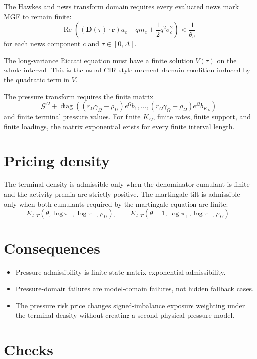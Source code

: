 \documentclass[11pt]{article}
\begin{document}
The Hawkes and news transform domain requires every evaluated news mark MGF to
remain finite:
\[
    \operatorname{Re}\!\left(
        (\mathbf D(\tau)\cdot\mathbf r)a_c
        +qm_c
        +\frac{1}{2}q^2\sigma_c^2
    \right)
    <
    \frac{1}{\theta_U}
\]
for each news component \(c\) and \(\tau\in[0,\Delta]\).

The long-variance Riccati equation must have a finite solution \(V(\tau)\) on
the whole interval.
This is the usual CIR-style moment-domain condition induced by the quadratic
term in \(V\).

The pressure transform requires the finite matrix
\[
    \mathcal G^\Omega+\operatorname{diag}\left(
        (r_\Omega\gamma_\Omega-\rho_\Omega)e^\Omega b_1,
        \ldots,
        (r_\Omega\gamma_\Omega-\rho_\Omega)e^\Omega b_{K_\Omega}
    \right)
\]
and finite terminal pressure values.
For finite \(K_\Omega\), finite rates, finite support, and finite loadings, the
matrix exponential exists for every finite interval length.

\section{Pricing density}

The terminal density is admissible only when the denominator cumulant is finite
and the activity premia are strictly positive.
The martingale tilt is admissible only when both cumulants required by the
martingale equation are finite:
\[
    K_{t,T}(\theta,\log\pi_+,\log\pi_-,\rho_\Omega),
    \qquad
    K_{t,T}(\theta+1,\log\pi_+,\log\pi_-,\rho_\Omega).
\]

\section{Consequences}

\begin{itemize}
    \item Pressure admissibility is finite-state matrix-exponential admissibility.
    \item Pressure-domain failures are model-domain failures, not hidden fallback cases.
    \item The pressure risk price changes signed-imbalance exposure weighting under the terminal density without creating a second physical pressure model.
\end{itemize}

\section{Checks}
\end{document}
